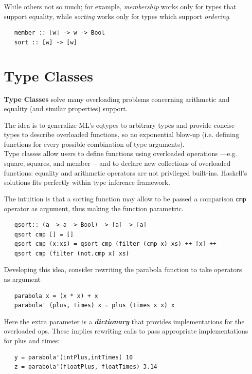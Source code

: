 While others not so much;
for example, \textit{membership} works only for types that support equality,
while \textit{sorting} works only for types which support \textit{ordering}. 
\begin{lstlisting}
   member :: [w] -> w -> Bool
   sort :: [w] -> [w]
\end{lstlisting}

\section{Type Classes}
\textbf{Type Classes} solve many overloading problems concerning arithmetic and equality (and similar properties) support.

The idea is to generalize ML’s eqtypes to arbitrary types
and provide concise types to describe overloaded
functions, so no exponential blow-up (i.e. defining functions for every possible combination of type arguments).\\
Type classes allow users to define functions using overloaded
operations {---}e.g. square, squares, and member{---} and to
declare new collections of
overloaded functions: equality and arithmetic
operators are not privileged built-ins.
Haskell's solutions fits perfectly within type inference framework.

The intuition is that a sorting function may allow to be passed a comparison \lstinline|cmp| operator as argument,
thus making the function parametric.
\begin{lstlisting}
   qsort:: (a -> a -> Bool) -> [a] -> [a]
   qsort cmp [] = []
   qsort cmp (x:xs) = qsort cmp (filter (cmp x) xs) ++ [x] ++
   qsort cmp (filter (not.cmp x) xs)
\end{lstlisting}

Developing this idea, consider rewriting the parabola function to take operators as argument
\begin{lstlisting}
   parabola x = (x * x) + x
   parabola' (plus, times) x = plus (times x x) x
\end{lstlisting}
Here the extra parameter is a \textit{\textbf{dictionary}} that provides implementations for the overloaded ops.
These implies rewriting calls to pass appropriate implementations for plus and times:
\begin{lstlisting}
   y = parabola'(intPlus,intTimes) 10
   z = parabola'(floatPlus, floatTimes) 3.14
\end{lstlisting}

